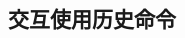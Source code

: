 \documentclass[class=book, crop=false]{standalone}
\begin{document}
\begin{CJK}{UTF8}{gbsn}

\chapter{交互使用历史命令}





\cleardoublepage

\end{CJK}
\end{document}
